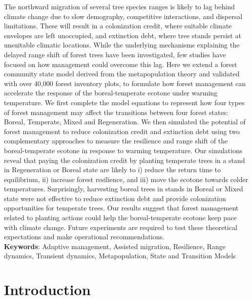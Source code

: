 The northward migration of several tree species ranges is likely to lag
behind climate change due to slow demography, competitive interactions,
and dispersal limitations. These will result in a colonization credit,
where suitable climate envelopes are left unoccupied, and extinction
debt, where tree stands persist at unsuitable climatic locations. While
the underlying mechanisms explaining the delayed range shift of forest
trees have been investigated, few studies have focused on how management
could overcome this lag. Here we extend a forest community state model
derived from the metapopulation theory and validated with over 40,000
forest inventory plots, to formulate how forest management can
accelerate the response of the boreal-temperate ecotone under warming
temperature. We first complete the model equations to represent how four
types of forest management may affect the transitions between four
forest states: Boreal, Temperate, Mixed and Regeneration. We then
simulated the potential of forest management to reduce colonization
credit and extinction debt using two complementary approaches to measure
the resilience and range shift of the boreal-temperate ecotone in
response to warming temperature. Our simulations reveal that paying the
colonization credit by planting temperate trees in a stand in
Regeneration or Boreal state are likely to i) reduce the return time to
equilibrium, ii) increase forest resilience, and iii) move the ecotone
towards colder temperatures. Surprisingly, harvesting boreal trees in
stands in Boreal or Mixed state were not effective to reduce extinction
debt and provide colonization opportunities for temperate trees. Our
results suggest that forest management related to planting actions could
help the boreal-temperate ecotone keep pace with climate change. Future
experiments are required to test these theoretical expectations and make
operational recommendations.\\

\textbf{Keywords}: Adaptive management, Assisted
migration, Resilience, Range dynamics, Transient
dynamics, Metapopulation, State and Transition Models

\hypertarget{introduction}{%
\section{Introduction}\label{introduction}}

